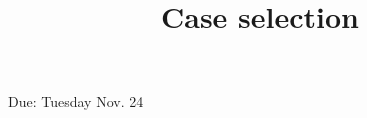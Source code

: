\documentclass[a4, 12pt]{article}
\title{Case selection}
\author{}
\date{}
\begin{document}
\maketitle

Due: Tuesday Nov. 24
\end{document}
